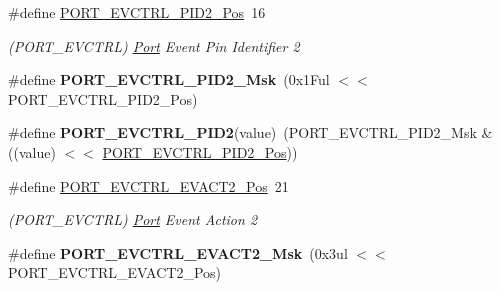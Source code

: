\begin{DoxyCompactItemize}
\item 
\hypertarget{group___s_a_m_l21___p_o_r_t_gaa21f7704518c8b141129d4bded526ffa}{}\#define \hyperlink{group___s_a_m_l21___p_o_r_t_gaa21f7704518c8b141129d4bded526ffa}{P\+O\+R\+T\+\_\+\+E\+V\+C\+T\+R\+L\+\_\+\+P\+I\+D2\+\_\+\+Pos}~16\label{group___s_a_m_l21___p_o_r_t_gaa21f7704518c8b141129d4bded526ffa}

\begin{DoxyCompactList}\small\item\em (P\+O\+R\+T\+\_\+\+E\+V\+C\+T\+R\+L) \hyperlink{struct_port}{Port} Event Pin Identifier 2 \end{DoxyCompactList}\item 
\hypertarget{group___s_a_m_l21___p_o_r_t_ga346d437ebf7b41a9a49da801e9f6517b}{}\#define {\bfseries P\+O\+R\+T\+\_\+\+E\+V\+C\+T\+R\+L\+\_\+\+P\+I\+D2\+\_\+\+Msk}~(0x1\+Ful $<$$<$ P\+O\+R\+T\+\_\+\+E\+V\+C\+T\+R\+L\+\_\+\+P\+I\+D2\+\_\+\+Pos)\label{group___s_a_m_l21___p_o_r_t_ga346d437ebf7b41a9a49da801e9f6517b}

\item 
\hypertarget{group___s_a_m_l21___p_o_r_t_ga50751a2216b9476460efc8673b560e8d}{}\#define {\bfseries P\+O\+R\+T\+\_\+\+E\+V\+C\+T\+R\+L\+\_\+\+P\+I\+D2}(value)~(P\+O\+R\+T\+\_\+\+E\+V\+C\+T\+R\+L\+\_\+\+P\+I\+D2\+\_\+\+Msk \& ((value) $<$$<$ \hyperlink{group___s_a_m_l21___p_o_r_t_gaa21f7704518c8b141129d4bded526ffa}{P\+O\+R\+T\+\_\+\+E\+V\+C\+T\+R\+L\+\_\+\+P\+I\+D2\+\_\+\+Pos}))\label{group___s_a_m_l21___p_o_r_t_ga50751a2216b9476460efc8673b560e8d}

\item 
\hypertarget{group___s_a_m_l21___p_o_r_t_gacd45d1b50592f003b3d9e42a85132211}{}\#define \hyperlink{group___s_a_m_l21___p_o_r_t_gacd45d1b50592f003b3d9e42a85132211}{P\+O\+R\+T\+\_\+\+E\+V\+C\+T\+R\+L\+\_\+\+E\+V\+A\+C\+T2\+\_\+\+Pos}~21\label{group___s_a_m_l21___p_o_r_t_gacd45d1b50592f003b3d9e42a85132211}

\begin{DoxyCompactList}\small\item\em (P\+O\+R\+T\+\_\+\+E\+V\+C\+T\+R\+L) \hyperlink{struct_port}{Port} Event Action 2 \end{DoxyCompactList}\item 
\hypertarget{group___s_a_m_l21___p_o_r_t_gabc5bcd7589a3e7df0b8462c67cf17dde}{}\#define {\bfseries P\+O\+R\+T\+\_\+\+E\+V\+C\+T\+R\+L\+\_\+\+E\+V\+A\+C\+T2\+\_\+\+Msk}~(0x3ul $<$$<$ P\+O\+R\+T\+\_\+\+E\+V\+C\+T\+R\+L\+\_\+\+E\+V\+A\+C\+T2\+\_\+\+Pos)\label{group___s_a_m_l21___p_o_r_t_gabc5bcd7589a3e7df0b8462c67cf17dde}


\end{DoxyCompactItemize}
